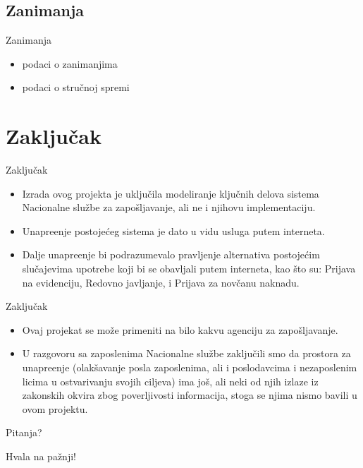 \documentclass[11pt]{beamer}
\begin{document}
\subsection{Zanimanja}
\begin{frame}{Zanimanja}
		\begin{itemize}
			\item podaci o zanimanjima
			\item podaci o stru\v cnoj spremi
		\end{itemize}
\end{frame}


\section{Zaklju\v cak}
\begin{frame}{Zaklju\v cak}
	\begin{itemize}
		\item Izrada ovog projekta je uklju\v cila modeliranje klju\v cnih delova sistema Nacionalne slu\v zbe za zapo\v sljavanje, ali ne i njihovu implementaciju. 
		\item Unapre\dj enje postoje\' ceg sistema je dato u vidu usluga putem interneta. \item Dalje unapre\dj enje bi podrazumevalo pravljenje alternativa postoje\' cim slu\v cajevima upotrebe koji bi se obavljali putem interneta, kao \v sto su: Prijava na evidenciju, Redovno javljanje, i Prijava za nov\v canu naknadu.

	\end{itemize}
\end{frame}	

\begin{frame}{Zaklju\v cak}
\begin{itemize}	
		\item Ovaj projekat se mo\v ze primeniti na bilo kakvu agenciju za zapo\v sljavanje.
		\item U razgovoru sa zaposlenima Nacionalne slu\v zbe zaklju\v cili smo da prostora za unapre\dj enje (olak\v savanje posla zaposlenima, ali i poslodavcima i nezaposlenim licima u ostvarivanju svojih ciljeva) ima jo\v s, ali neki od njih izlaze iz zakonskih okvira zbog poverljivosti informacija, stoga se njima nismo bavili u ovom projektu.
	\end{itemize}
\end{frame}

\begin{frame}
	Pitanja?
\end{frame}

\begin{frame}
	Hvala na pa\v znji!
\end{frame}
\end{document}

